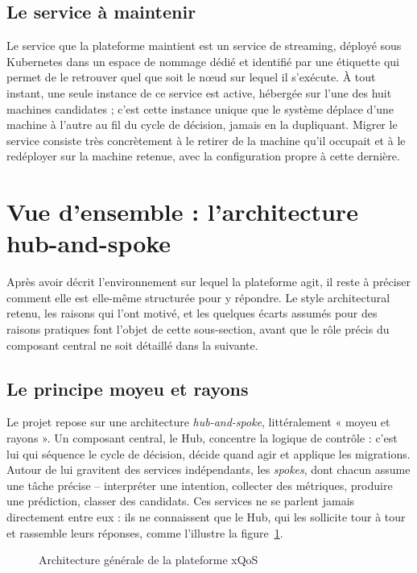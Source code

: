 \subsection{Le service à maintenir}
\label{sec:service}

Le service que la plateforme maintient est un service de streaming, déployé sous Kubernetes dans un espace de nommage dédié et identifié par une étiquette qui permet de le retrouver quel que soit le nœud sur lequel il s'exécute. À tout instant, une seule instance de ce service est active, hébergée sur l'une des huit machines candidates ; c'est cette instance unique que le système déplace d'une machine à l'autre au fil du cycle de décision, jamais en la dupliquant. Migrer le service consiste très concrètement à le retirer de la machine qu'il occupait et à le redéployer sur la machine retenue, avec la configuration propre à cette dernière.
\section{Vue d'ensemble : l'architecture hub-and-spoke}
\label{sec:hub-and-spoke}

Après avoir décrit l'environnement sur lequel la plateforme agit, il reste à préciser comment elle est elle-même structurée pour y répondre. Le style architectural retenu, les raisons qui l'ont motivé, et les quelques écarts assumés pour des raisons pratiques font l'objet de cette sous-section, avant que le rôle précis du composant central ne soit détaillé dans la suivante.

\subsection{Le principe moyeu et rayons}
Le projet repose sur une architecture \emph{hub-and-spoke}, littéralement « moyeu et rayons ». Un composant central, le Hub, concentre la logique de contrôle : c'est lui qui séquence le cycle de décision, décide quand agir et applique les migrations. Autour de lui gravitent des services indépendants, les \emph{spokes}, dont chacun assume une tâche précise -- interpréter une intention, collecter des métriques, produire une prédiction, classer des candidats. Ces services ne se parlent jamais directement entre eux : ils ne connaissent que le Hub, qui les sollicite tour à tour et rassemble leurs réponses, comme l'illustre la figure~\ref{fig:hub-and-spoke}.

\begin{figure}[H]
    \centering
    \caption{Architecture générale de la plateforme xQoS}
    \label{fig:hub-and-spoke}
\end{figure}

